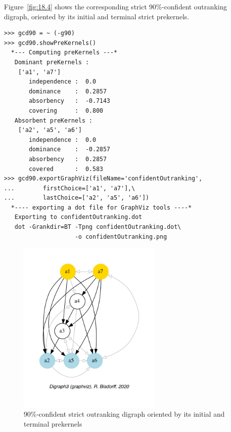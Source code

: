 Figure~\vref{fig:18.4} shows the corresponding strict $90\%$-confident outranking digraph, oriented by its initial and terminal strict prekernels.
\begin{lstlisting}
>>> gcd90 = ~ (-g90)
>>> gcd90.showPreKernels()
  *--- Computing preKernels ---*
   Dominant preKernels :
    ['a1', 'a7']
       independence :  0.0
       dominance    :  0.2857
       absorbency   :  -0.7143
       covering     :  0.800
   Absorbent preKernels :
    ['a2', 'a5', 'a6']
       independence :  0.0
       dominance    :  -0.2857
       absorbency   :  0.2857
       covered      :  0.583
>>> gcd90.exportGraphViz(fileName='confidentOutranking',
...        firstChoice=['a1', 'a7'],\
...        lastChoice=['a2', 'a5', 'a6'])
  *---- exporting a dot file for GraphViz tools ----*
   Exporting to confidentOutranking.dot
   dot -Grankdir=BT -Tpng confidentOutranking.dot\
                    -o confidentOutranking.png
\end{lstlisting}
\begin{figure}[ht]
\sidecaption[t]
\includegraphics[width=7cm]{Figures/18-4-confidentOutranking.pdf}
\caption{90\%-confident strict outranking digraph oriented by its initial and terminal prekernels}
\label{fig:18.4}       %
\end{figure}

